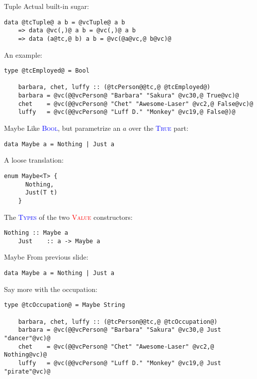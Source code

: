 \documentclass[xcolor={usenames,dvipsnames}]{beamer}
\newcommand{\htycon}[1]{\textcolor{Blue}{\textsc{#1}}}
\newcommand{\hvalcon}[1]{\textcolor{Red}{\textsc{#1}}}
\begin{document}
\begin{frame}[fragile]{Tuple}
  Actual built-in sugar:
  \begin{lstlisting}[style=hask]
       data @tcTuple@ a b = @vcTuple@ a b
    => data @vc(,)@ a b = @vc(,)@ a b
    => data (a@tc,@ b) a b = @vc(@a@vc,@ b@vc)@
  \end{lstlisting}

  \pause
  An example:
  \begin{lstlisting}[style=hask]
    type @tcEmployed@ = Bool

    barbara, chet, luffy :: (@tcPerson@@tc,@ @tcEmployed@)
    barbara = @vc(@@vcPerson@ "Barbara" "Sakura" @vc30,@ True@vc)@
    chet    = @vc(@@vcPerson@ "Chet" "Awesome-Laser" @vc2,@ False@vc)@
    luffy   = @vc(@@vcPerson@ "Luff D." "Monkey" @vc19,@ False@)@
  \end{lstlisting}
\end{frame}

\begin{frame}[fragile]{Maybe}
  Like \htycon{Bool}, but parametrize an $a$ over the \htycon{True} part:
  \begin{lstlisting}[style=hask]
    data Maybe a = Nothing | Just a
  \end{lstlisting}

  \pause
  A loose translation:
  \begin{lstlisting}[style=hask]
    enum Maybe<T> {
      Nothing,
      Just(T t)
    }
  \end{lstlisting}

  \pause
  The \htycon{Types} of the two \hvalcon{Value} constructors:
  \begin{lstlisting}[style=hask]
    Nothing :: Maybe a
    Just    :: a -> Maybe a
  \end{lstlisting}
\end{frame}

\begin{frame}[fragile]{Maybe}
  From previous slide:
  \begin{lstlisting}[style=hask]
    data Maybe a = Nothing | Just a
  \end{lstlisting}

  \pause
  Say more with the occupation:
  \begin{lstlisting}[style=hask]
    type @tcOccupation@ = Maybe String

    barbara, chet, luffy :: (@tcPerson@@tc,@ @tcOccupation@)
    barbara = @vc(@@vcPerson@ "Barbara" "Sakura" @vc30,@ Just "dancer"@vc)@
    chet    = @vc(@@vcPerson@ "Chet" "Awesome-Laser" @vc2,@ Nothing@vc)@
    luffy   = @vc(@@vcPerson@ "Luff D." "Monkey" @vc19,@ Just "pirate"@vc)@
  \end{lstlisting}
\end{frame}
\end{document}
